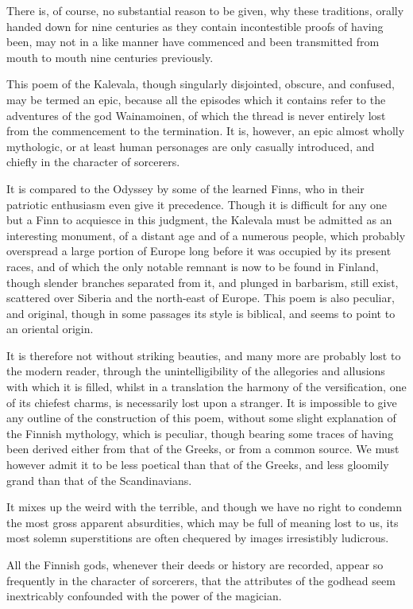 \documentclass[11pt,a4paper]{article}
\begin{document}
There is, of course, no substantial reason to be given, why these traditions, orally handed down for nine centuries as they contain incontestible proofs of having been, may not in a like manner have commenced and been transmitted from mouth to mouth nine centuries previously.

This poem of the Kalevala, though singularly disjointed, obscure, and confused, may be termed an epic, because all the episodes which it contains refer to the adventures of the god Wainamoinen, of which the thread is never entirely lost from the commencement to the termination. It is, however, an epic almost wholly mythologic, or at least human personages are only casually introduced, and chiefly in the character of sorcerers.

It is compared to the Odyssey by some of the learned Finns, who in their patriotic enthusiasm even give it precedence. Though it is difficult for any one but a Finn to acquiesce in this judgment, the Kalevala must be admitted as an interesting monument, of a distant age and of a numerous people, which probably overspread a large portion of Europe long before it was occupied by its present races, and of which the only notable remnant is now to be found in Finland, though slender branches separated from it, and plunged in barbarism, still exist, scattered over Siberia and the north-east of Europe. This poem is also peculiar, and original, though in some passages its style is biblical, and seems to point to an oriental origin.

It is therefore not without striking beauties, and many more are probably lost to the modern reader, through the unintelligibility of the allegories and allusions with which it is filled, whilst in a translation the harmony of the versification, one of its chiefest charms, is necessarily lost upon a stranger. It is impossible to give any outline of the construction of this poem, without some slight explanation of the Finnish mythology, which is peculiar, though bearing some traces of having been derived either from that of the Greeks, or from a common source. We must however admit it to be less poetical than that of the Greeks, and less gloomily grand than that of the Scandinavians.

It mixes up the weird with the terrible, and though we have no right to condemn the most gross apparent absurdities, which may be full of meaning lost to us, its most solemn superstitions are often chequered by images irresistibly ludicrous.

All the Finnish gods, whenever their deeds or history are recorded, appear so frequently in the character of sorcerers, that the attributes of the godhead seem inextricably confounded with the power of the magician.
\end{document}
